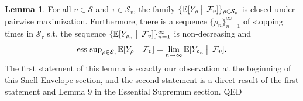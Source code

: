 \documentclass[12pt]{article}
\newcommand{\cF}{\mathcal{F}}
\newcommand{\cS}{\mathcal{S}}
\newcommand{\E}{\mathbb{E}}
\newcommand{\quantifyspace}{\hspace{2px} \big | \hspace{5px}}
\newcommand{\esssup}{\text{ess sup}}
\newcommand{\QED}{\hspace*{\fill}\textup{QED}}
\theoremstyle{definition}
\newtheorem{lemma}{Lemma}
\begin{document}
\begin{lemma} \cite{karatzas1998}
    For all $v \in \cS$ and $\tau \in \cS_v$, the family $\{\E[Y_\rho \quantifyspace \cF_v]\}_{\rho \in \cS_v}$ is closed
    under pairwise maximization. Furthermore, there is a sequence $\{\rho_n\}_{n=1}^\infty$ of stopping times in $\cS_\tau$ s.t.
    the sequence $\{\E [Y_{\rho_n} \quantifyspace \cF_v] \}_{n=1}^\infty$ is non-decreasing and
    \[
        \esssup_{\rho \in \cS_\tau} \E[Y_\rho \quantifyspace \cF_v] = \lim_{n\to \infty} \E[Y_{\rho_n} \quantifyspace \cF_v].
    \]
    \proof
    The first statement of this lemma is exactly our observation at the beginning of this Snell Envelope section, and the second statement is a direct result of the first statement and Lemma 9 in the Essential Supremum section. \QED \\
\end{lemma}
\end{document}
